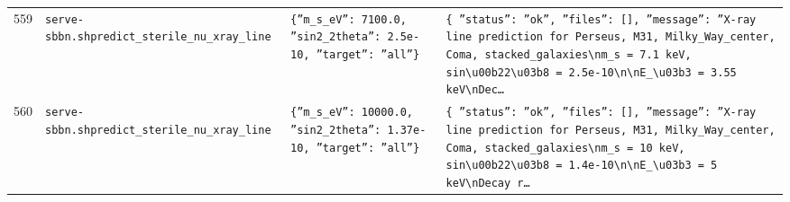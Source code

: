 \documentclass[11pt,a4paper]{article}
\begin{document}
\begin{longtable}{@{}p{}p{}p{}p{}@{}}
559 & \texttt{serve-sbbn.sh}\newline\texttt{predict\_\allowbreak{}sterile\_\allowbreak{}nu\_\allowbreak{}xray\_\allowbreak{}line} & \texttt{\{''m\_\allowbreak{}s\_\allowbreak{}eV'':\allowbreak{} 7100.0,\allowbreak{} ''sin2\_\allowbreak{}2theta'':\allowbreak{} 2.5e-10,\allowbreak{} ''target'':\allowbreak{} ''all''\}\allowbreak{}} & \texttt{\{   ''status'':\allowbreak{} ''ok'',\allowbreak{}   ''files'':\allowbreak{} []\allowbreak{},\allowbreak{}   ''message'':\allowbreak{} ''X-ray line prediction for Perseus,\allowbreak{} M31,\allowbreak{} Milky\_\allowbreak{}Way\_\allowbreak{}center,\allowbreak{} Coma,\allowbreak{} stacked\_\allowbreak{}galaxies\textbackslash{}\allowbreak{}nm\_\allowbreak{}s =\allowbreak{} 7.1 keV,\allowbreak{} sin\textbackslash{}\allowbreak{}u00b22\textbackslash{}\allowbreak{}u03b8 =\allowbreak{} 2.5e-10\textbackslash{}\allowbreak{}n\textbackslash{}\allowbreak{}nE\_\allowbreak{}\textbackslash{}\allowbreak{}u03b3 =\allowbreak{} 3.55 keV\textbackslash{}\allowbreak{}nDec\ldots{}\allowbreak{}} \\
560 & \texttt{serve-sbbn.sh}\newline\texttt{predict\_\allowbreak{}sterile\_\allowbreak{}nu\_\allowbreak{}xray\_\allowbreak{}line} & \texttt{\{''m\_\allowbreak{}s\_\allowbreak{}eV'':\allowbreak{} 10000.0,\allowbreak{} ''sin2\_\allowbreak{}2theta'':\allowbreak{} 1.37e-10,\allowbreak{} ''target'':\allowbreak{} ''all''\}\allowbreak{}} & \texttt{\{   ''status'':\allowbreak{} ''ok'',\allowbreak{}   ''files'':\allowbreak{} []\allowbreak{},\allowbreak{}   ''message'':\allowbreak{} ''X-ray line prediction for Perseus,\allowbreak{} M31,\allowbreak{} Milky\_\allowbreak{}Way\_\allowbreak{}center,\allowbreak{} Coma,\allowbreak{} stacked\_\allowbreak{}galaxies\textbackslash{}\allowbreak{}nm\_\allowbreak{}s =\allowbreak{} 10 keV,\allowbreak{} sin\textbackslash{}\allowbreak{}u00b22\textbackslash{}\allowbreak{}u03b8 =\allowbreak{} 1.4e-10\textbackslash{}\allowbreak{}n\textbackslash{}\allowbreak{}nE\_\allowbreak{}\textbackslash{}\allowbreak{}u03b3 =\allowbreak{} 5 keV\textbackslash{}\allowbreak{}nDecay r\ldots{}\allowbreak{}} \\

\end{longtable}
\end{document}
